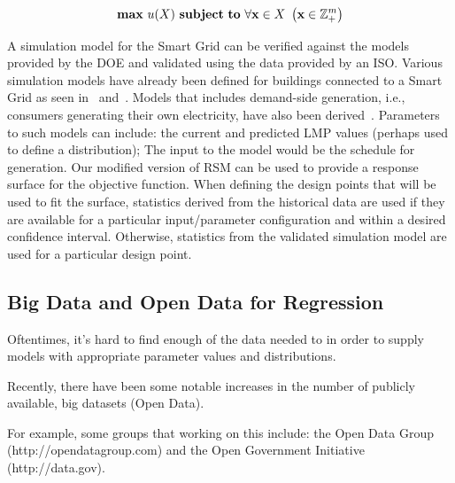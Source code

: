\documentclass{wscpaperproc}
\theoremstyle{wsc}
\begin{document}
$$ {\rm \bf max} ~ u(X) ~ {\rm \bf subject ~ to} ~ \forall {\bf x} \in X ~ \left( {\bf x} \in {\mathbb Z}_+^m \right) $$

A simulation model for the Smart Grid can be verified against the models
provided by the DOE and validated using the data provided by an ISO.
Various simulation models have already been defined for buildings connected to
a Smart Grid as seen in~\cite{Bakker2010} and~\cite{Pan2011}.
Models that includes demand-side generation, i.e., consumers generating their
own electricity, have also been derived~\cite{Houwing2006}.
Parameters to such models can include:
the current and predicted LMP values (perhaps used to define a distribution);
The input to the model would be the schedule for generation.
Our modified version of RSM can be used to provide a response surface for the
objective function.
When defining the design points that will be used to fit the surface, statistics
derived from the historical data are used if they are available for a particular
input/parameter configuration and within a desired confidence interval.
Otherwise, statistics from the validated simulation model are used for a
particular design point.

\subsection{Big Data and Open Data for Regression}

Oftentimes, it's hard to find enough of the data needed to in order to supply
models with appropriate parameter values and distributions.

Recently, there have been some notable increases in the number of publicly
available, big datasets (Open Data).

For example, some groups that working on this include:
the Open Data Group (http://opendatagroup.com) and the Open Government
Initiative (http://data.gov).
\end{document}
